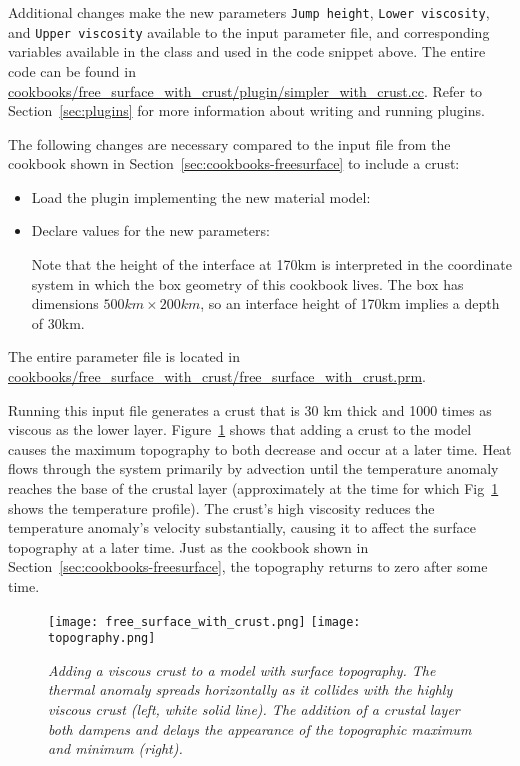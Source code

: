 Additional changes make the new parameters \texttt{Jump height}, \texttt{Lower
viscosity}, and \texttt{Upper viscosity} available to the input parameter file,
and corresponding variables available in the class and used in the code snippet
above. The entire code can be found in
\url{cookbooks/free_surface_with_crust/plugin/simpler_with_crust.cc}. Refer to
Section~\ref{sec:plugins} for more information about writing and running
plugins.

The following changes are necessary compared to the input file from the
cookbook shown in Section~\ref{sec:cookbooks-freesurface} to include a crust:
\begin{itemize}
  \item Load the plugin implementing the new material model:
  
  
  \item Declare values for the new parameters:
  
  Note that the height of the interface at 170km is interpreted in the
  coordinate system in which the box geometry of this cookbook lives. The box
  has dimensions $500\si{km}\times 200\si{km}$, so an interface height of
  170km implies a depth of 30km.
\end{itemize}

The entire parameter file is located in
\url{cookbooks/free_surface_with_crust/free_surface_with_crust.prm}.

Running this input file generates a
crust that is 30 km thick and 1000 times as viscous as the lower layer.
Figure~\ref{fig:freesurfaceWC} shows that adding a crust to the model causes the maximum topography to both decrease and occur at a later time.
Heat flows through the system primarily by advection until the temperature anomaly reaches the base of the
crustal layer (approximately at the time for which Fig~\ref{fig:freesurfaceWC}
shows the temperature profile).
The crust's high viscosity reduces the temperature anomaly's velocity
substantially, causing it to affect the surface topography at a later time. Just
as the cookbook shown in Section~\ref{sec:cookbooks-freesurface}, the
topography returns to zero after some time.

\begin{figure}
  \centering
  \texttt{[image: free\_surface\_with\_crust.png]}
  \hfill
  \texttt{[image: topography.png]}
  \caption{\it Adding a viscous crust to a model with surface topography. The
  thermal anomaly spreads horizontally as it collides with the highly viscous crust (left, white solid line). The addition of a crustal layer both dampens and delays the appearance of the topographic maximum and minimum (right).}
  \label{fig:freesurfaceWC}
\end{figure}

